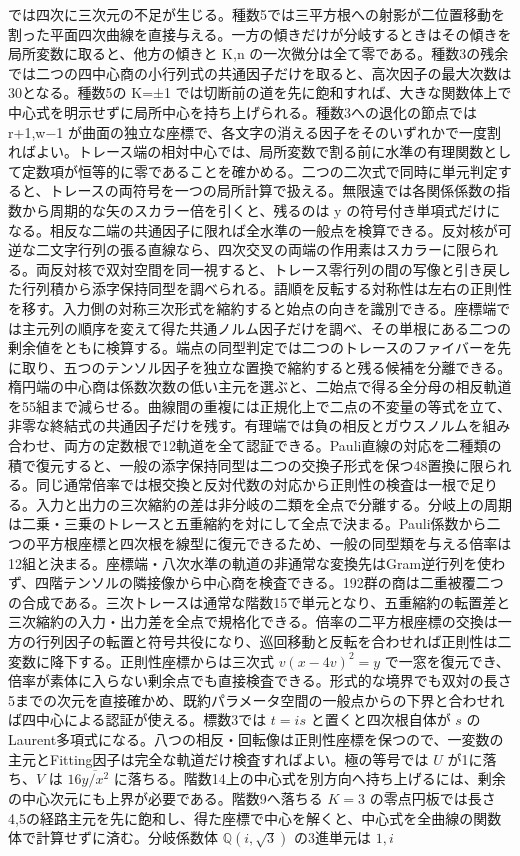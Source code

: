 \documentclass[11pt,a4paper]{ltjsarticle}
\begin{document}
では四次に三次元の不足が生じる。種数5では三平方根への射影が二位置移動を割った平面四次曲線を直接与える。一方の傾きだけが分岐するときはその傾きを局所変数に取ると、他方の傾きと K,n の一次微分は全て零である。種数3の残余では二つの四中心商の小行列式の共通因子だけを取ると、高次因子の最大次数は30となる。種数5の K=±1 では切断前の道を先に飽和すれば、大きな関数体上で中心式を明示せずに局所中心を持ち上げられる。種数3への退化の節点では r+1,w−1 が曲面の独立な座標で、各文字の消える因子をそのいずれかで一度割ればよい。トレース端の相対中心では、局所変数で割る前に水準の有理関数として定数項が恒等的に零であることを確かめる。二つの二次式で同時に単元判定すると、トレースの両符号を一つの局所計算で扱える。無限遠では各関係係数の指数から周期的な矢のスカラー倍を引くと、残るのは y の符号付き単項式だけになる。相反な二端の共通因子に限れば全水準の一般点を検算できる。反対核が可逆な二文字行列の張る直線なら、四次交叉の両端の作用素はスカラーに限られる。両反対核で双対空間を同一視すると、トレース零行列の間の写像と引き戻した行列積から添字保持同型を調べられる。語順を反転する対称性は左右の正則性を移す。入力側の対称三次形式を縮約すると始点の向きを識別できる。座標端では主元列の順序を変えて得た共通ノルム因子だけを調べ、その単根にある二つの剰余値をともに検算する。端点の同型判定では二つのトレースのファイバーを先に取り、五つのテンソル因子を独立な置換で縮約すると残る候補を分離できる。楕円端の中心商は係数次数の低い主元を選ぶと、二始点で得る全分母の相反軌道を55組まで減らせる。曲線間の重複には正規化上で二点の不変量の等式を立て、非零な終結式の共通因子だけを残す。有理端では負の相反とガウスノルムを組み合わせ、両方の定数根で12軌道を全て認証できる。Pauli直線の対応を二種類の積で復元すると、一般の添字保持同型は二つの交換子形式を保つ48置換に限られる。同じ通常倍率では根交換と反対代数の対応から正則性の検査は一根で足りる。入力と出力の三次縮約の差は非分岐の二類を全点で分離する。分岐上の周期は二乗・三乗のトレースと五重縮約を対にして全点で決まる。Pauli係数から二つの平方根座標と四次根を線型に復元できるため、一般の同型類を与える倍率は12組と決まる。座標端・八次水準の軌道の非通常な変換先はGram逆行列を使わず、四階テンソルの隣接像から中心商を検査できる。192群の商は二重被覆二つの合成である。三次トレースは通常な階数15で単元となり、五重縮約の転置差と三次縮約の入力・出力差を全点で規格化できる。倍率の二平方根座標の交換は一方の行列因子の転置と符号共役になり、巡回移動と反転を合わせれば正則性は二変数に降下する。正則性座標からは三次式 $v(x-4v)^2=y$ で一窓を復元でき、倍率が素体に入らない剰余点でも直接検査できる。形式的な境界でも双対の長さ5までの次元を直接確かめ、既約パラメータ空間の一般点からの下界と合わせれば四中心による認証が使える。標数3では $t=is$ と置くと四次根自体が $s$ のLaurent多項式になる。八つの相反・回転像は正則性座標を保つので、一変数の主元とFitting因子は完全な軌道だけ検査すればよい。極の等号では $U$ が1に落ち、$V$ は $16\overline{y/x^2}$ に落ちる。階数14上の中心式を別方向へ持ち上げるには、剰余の中心次元にも上界が必要である。階数9へ落ちる $K=3$ の零点円板では長さ4,5の経路主元を先に飽和し、得た座標で中心を解くと、中心式を全曲線の関数体で計算せずに済む。分岐係数体 $\mathbb Q(i,\sqrt3)$ の3進単元は $1,i$ 
\end{document}

